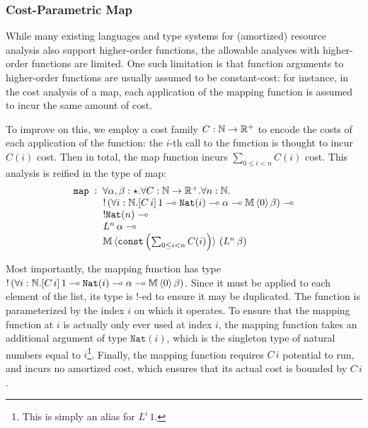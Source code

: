 \subsubsection{Cost-Parametric Map}
While many existing languages and type systems for (amortized) resource analysis also support higher-order functions, the allowable analyses with higher-order functions are limited. One such limitation is that function arguments to higher-order functions are usually assumed to be constant-cost: for instance, in the cost analysis of a map, each application of the mapping function is assumed to incur the same amount of cost.

To improve on this, we employ a cost family $C : \mathbb{N} \to \mathbb{R}^+$ to encode the costs of each application of the function: the $i$-th call to the function is thought to incur $C(i)$ cost. Then in total, the map function incurs $\sum_{0 \leq i < n} C(i)$ cost. This analysis is reified in the type of map:
$$
\begin{array}{l}
\texttt{map} \; : \; \forall \alpha,\beta : \star. \forall C : \mathbb{N} \to \mathbb{R}^+. \forall n : \mathbb{N}. \\
\hspace{3em} !\left(\forall i : \mathbb{N}. [C \, i] \, 1 \multimap \texttt{Nat}(i) \multimap \alpha \multimap \mathbb{M} \, \langle 0 \rangle\,  \beta\right) \multimap\\
\hspace{3em}  !\texttt{Nat}(n) \multimap \\
\hspace{3em}  L^n \,\alpha \multimap\\ 
\hspace{3em}  \mathbb{M} \, \langle \texttt{const}\left(\sum_{0 \leq i < n} C(i)\right) \rangle\, \left(L^n \, \beta\right)
\end{array}
$$

Most importantly, the mapping function has type $!\left(\forall i : \mathbb{N}. [C \, i] \, 1 \multimap \texttt{Nat}(i) \multimap \alpha \multimap \mathbb{M} \, \langle 0 \rangle\,  \beta\right)$. Since it must be applied to each element of the list, its type is $!$-ed to ensure it may be duplicated. The function is parameterized by the index $i$ on which it operates. To ensure that the mapping function at $i$ is actually only ever used at index $i$, the mapping function takes an additional argument of type $\texttt{Nat}(i)$, which is the singleton type of natural numbers equal to $i$\footnote{
This is simply an alias for $L^i \, 1$.
}. Finally, the mapping function requires $C \, i$ potential to run, and incurs no amortized cost, which ensures that its actual cost is bounded by $C \, i$.

